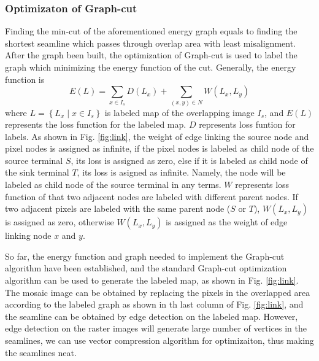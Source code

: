 \documentclass[journal]{IEEEtran}
\begin{document}
\subsubsection{Optimizaton of Graph-cut}
Finding the min-cut of the aforementioned energy graph equals to finding the shortest seamline which passes through overlap area with least misalignment. After the graph been built, the optimization of Graph-cut is used to label the graph which minimizing the energy function of the cut. Generally, the energy function is
\begin{equation}\label{eq5}
E(L)=\sum_{x\in I_s} D(L_x)+\sum_{(x,y)\in N} W(L_x,L_y)
\end{equation}
where $L=\left \{ L_{x}\mid x\in I_s \right \}$ is labeled map of the overlapping image $I_s$, and $E(L)$ represents the loss function for the labeled map. $D$ represents loss funtion for labels. As shown in Fig. \ref{fig:link}, the weight of edge linking the source node and pixel nodes is assigned as infinite, if the pixel nodes is labeled as child node of the source terminal $S$, its loss is assigned as zero, else if it is labeled as child node of the sink terminal $T$, its loss is asigned as infinite. Namely, the node will be labeled as child node of the source terminal in any terms. $W$ represents loss function of that two adjacent nodes are labeled with different parent nodes. If two adjacent pixels are labeled with the same parent node ($S$ or $T$), $W(L_x,L_y)$ is assigned as zero, otherwise $W(L_x,L_y)$ is assigned as the weight of edge linking node $x$ and $y$.

So far, the energy function and graph needed to implement the Graph-cut algorithm have been established, and the standard Graph-cut optimization algorithm can be used to generate the labeled map, as shown in Fig. \ref{fig:link}. The mosaic image can be obtained by replacing the pixels in the overlapped area according to the labeled graph as shown in th last column of Fig. \ref{fig:link}, and the seamline can be obtained by edge detection on the labeled map. However, edge detection on the raster images will generate large number of vertices in the seamlines, we can use vector compression algorithm for optimizaiton, thus making the seamlines neat.
\end{document}
